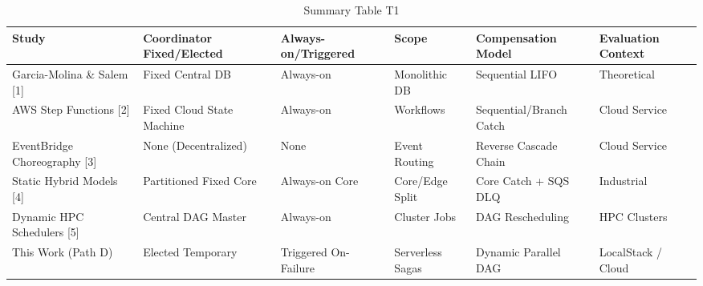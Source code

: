 \begin{table}[htbp]
\centering
\caption{Summary Table T1}
\label{tab:t1}
\begin{tabular}{llllll}
\toprule
Study & Coordinator Fixed/Elected & Always-on/Triggered & Scope & Compensation Model & Evaluation Context \\
\midrule
Garcia-Molina \& Salem [1] & Fixed Central DB & Always-on & Monolithic DB & Sequential LIFO & Theoretical \\
AWS Step Functions [2] & Fixed Cloud State Machine & Always-on & Workflows & Sequential/Branch Catch & Cloud Service \\
EventBridge Choreography [3] & None (Decentralized) & None & Event Routing & Reverse Cascade Chain & Cloud Service \\
Static Hybrid Models [4] & Partitioned Fixed Core & Always-on Core & Core/Edge Split & Core Catch + SQS DLQ & Industrial \\
Dynamic HPC Schedulers [5] & Central DAG Master & Always-on & Cluster Jobs & DAG Rescheduling & HPC Clusters \\
This Work (Path D) & Elected Temporary & Triggered On-Failure & Serverless Sagas & Dynamic Parallel DAG & LocalStack / Cloud \\
\bottomrule
\end{tabular}
\end{table}
